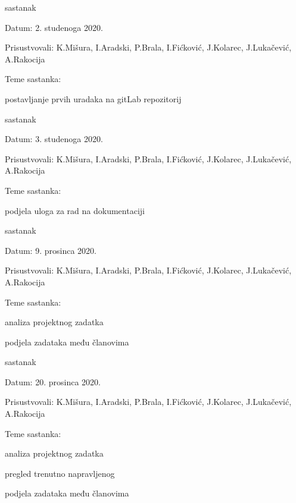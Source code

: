 \begin{packed_enum}
			\item  sastanak
			\item[] \begin{packed_item}
				\item Datum: 2. studenoga 2020.
				\item Prisustvovali:  K.Mišura, I.Aradski, P.Brala, I.Fićković, J.Kolarec, J.Lukačević, A.Rakocija
				\item Teme sastanka:
				\begin{packed_item}
					\item  postavljanje prvih uradaka na gitLab repozitorij 
				\end{packed_item}
			\end{packed_item}
			
			\item  sastanak
			\item[] \begin{packed_item}
				\item Datum: 3. studenoga 2020.
				\item Prisustvovali:  K.Mišura, I.Aradski, P.Brala, I.Fićković, J.Kolarec, J.Lukačević, A.Rakocija
				\item Teme sastanka:
				\begin{packed_item}
					\item  podjela uloga za rad na dokumentaciji 
				\end{packed_item}
			\end{packed_item}
			
			\item  sastanak
			\item[] \begin{packed_item}
				\item Datum: 9. prosinca 2020.
				\item Prisustvovali:  K.Mišura, I.Aradski, P.Brala, I.Fićković, J.Kolarec, J.Lukačević, A.Rakocija
				\item Teme sastanka:
				\begin{packed_item}
					\item  analiza projektnog zadatka 
					\item  podjela zadataka među članovima
				\end{packed_item}
			\end{packed_item}
			
			\item  sastanak
			\item[] \begin{packed_item}
				\item Datum: 20. prosinca 2020.
				\item Prisustvovali:  K.Mišura, I.Aradski, P.Brala, I.Fićković, J.Kolarec, J.Lukačević, A.Rakocija
				\item Teme sastanka:
				\begin{packed_item}
					\item  analiza projektnog zadatka 
					\item  pregled trenutno napravljenog
					\item  podjela zadataka među članovima
				\end{packed_item}
			\end{packed_item}
			

\end{packed_enum}
